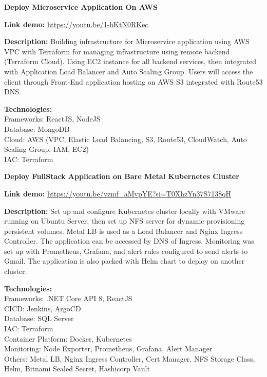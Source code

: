 \documentclass[letterpaper,10pt]{article}
\newcommand{\heading}[2]{
  \hspace{10pt}#1\hfill#2\\
}
\newcommand{\headingBf}[2]{
  \heading{\textbf{#1}}{\textbf{#2}}
}
\newenvironment{resume_list}{
  \vspace{-7pt}
  \begin{itemize}[itemsep=-2px, parsep=1pt, leftmargin=30pt]
}{
  \end{itemize}
}
\begin{document}
\headingBf{Deploy Microservice Application On AWS}{}
\begin{resume_list}
    \item \textbf{Link demo:} \href{https://youtu.be/1-hKtN0RKec}{https://youtu.be/1-hKtN0RKec}
    \item \textbf{Description:} 
    Building infrastructure for Microservice application using AWS VPC with Terraform for managing infrastructure using remote backend (Terraform Cloud). Using EC2 instance for all backend services, then integrated with Application Load Balancer and Auto Scaling Group. Users will access the client through Front-End application hosting on AWS S3 integrated with Route53 DNS.
    \item \textbf{Technologies:} \\
    Frameworks: ReactJS, NodeJS \\
    Database: MongoDB \\
    Cloud: AWS (VPC, Elastic Load Balancing, S3, Route53, CloudWatch, Auto Scaling Group, IAM, EC2) \\
    IAC: Terraform
\end{resume_list}

\headingBf{Deploy FullStack Application on Bare Metal Kubernetes Cluster}{}
\begin{resume_list}
    \item \textbf{Link demo:} \href{https://youtu.be/vzmf_aMvpYE?si=T0XhzYn37S7138qH}{https://youtu.be/vzmf_aMvpYE?si=T0XhzYn37S7138qH}
    \item \textbf{Description:} 
    Set up and configure Kubernetes cluster locally with VMware running on Ubuntu Server, then set up NFS server for dynamic provisioning persistent volumes. Metal LB is used as a Load Balancer and Nginx Ingress Controller. The application can be accessed by DNS of Ingress. Monitoring was set up with Prometheus, Grafana, and alert rules configured to send alerts to Gmail. The application is also packed with Helm chart to deploy on another cluster.
    \item \textbf{Technologies:} \\
    Frameworks: .NET Core API 8, ReactJS \\
    CICD: Jenkins, ArgoCD \\
    Database: SQL Server \\
    IAC: Terraform \\
    Container Platform: Docker, Kubernetes \\
    Monitoring: Node Exporter, Prometheus, Grafana, Alert Manager \\
    Others: Metal LB, Nginx Ingress Controller, Cert Manager, NFS Storage Class, Helm, Bitnami Sealed Secret, Hashicorp Vault
\end{resume_list}
\end{document}
